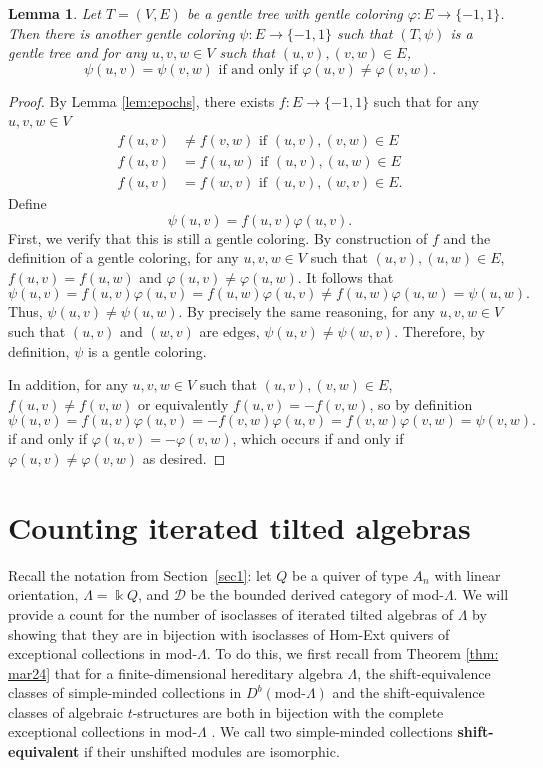 \documentclass[12pt]{amsart}
\newtheorem{lem}[thm]{Lemma}
\theoremstyle{definition}
\theoremstyle{remark}
\numberwithin{equation}{section}
\newcommand{\kk}{\ensuremath{\Bbbk}}
\newcommand{\cD}{\ensuremath{{\mathcal{D}}}}
\begin{document}
\begin{lem}\label{lem: canonical ideal}
Let $T = (V,E)$ be a gentle tree with gentle coloring $\varphi: E \to \{-1,1\}$. Then there is another gentle coloring $\psi: E \to \{-1,1\}$ such that $(T, \psi)$ is a gentle tree and for any $u, v, w \in V$ such that $(u,v), (v,w) \in E$, 
\[\psi(u,v) = \psi(v,w) \text{ if and only if } \varphi(u,v) \neq \varphi(v,w).\]
\end{lem}

\begin{proof}
By Lemma \ref{lem:epochs}, there exists $f: E \to \{-1,1\}$ such that for any $u, v, w \in V$
\begin{align*}
    f(u,v) &\neq f(v,w) \text{ if } (u,v), (v,w) \in E \\
    f(u,v) &= f(u,w) \text{ if } (u,v), (u,w) \in E \\
    f(u,v) &= f(w,v) \text{ if } (u,v), (w,v) \in E.
    \end{align*}
Define 
\[\psi(u,v) = f(u,v)\varphi(u,v).\]
First, we verify that this is still a gentle coloring. By construction of $f$ and the definition of a gentle coloring, for any $u, v, w \in V$ such that $(u,v), (u,w) \in E$, $f(u,v) = f(u,w)$ and $\varphi(u,v) \neq \varphi(u,w)$. It follows that
\[\psi(u,v) = f(u,v) \varphi(u,v) = f(u,w)\varphi(u,v) \neq f(u,w) \varphi(u,w) = \psi(u,w). \]
Thus, $\psi(u,v) \neq \psi(u,w)$. By precisely the same reasoning, for any $u,v,w \in V$ such that $(u,v)$ and $(w,v)$ are edges, $\psi(u,v) \neq \psi(w,v)$. Therefore, by definition, $\psi$ is a gentle coloring.

In addition, for any $u,v,w \in V$ such that $(u,v), (v,w) \in E$, $f(u,v) \neq f(v,w)$ or equivalently $f(u,v) = -f(v,w)$, so by definition
\[\psi(u,v) = f(u,v)\varphi(u,v) = -f(v,w) \varphi(u,v) = f(v,w) \varphi(v,w) = \psi(v,w).\]
if and only if $\varphi(u,v) = -\varphi(v,w)$, which occurs if and only if $\varphi(u,v) \neq \varphi(v,w)$ as desired.
\end{proof}

\section{Counting iterated tilted algebras}\label{sec2}

Recall the notation from Section~\ref{sec1}: let $Q$ be a quiver of type $A_n$ with linear orientation, $\Lambda = \kk Q$, and $\cD$ be the bounded derived category of mod-$\Lambda$. We will provide a count for the number of isoclasses of iterated tilted algebras of $\Lambda$ by showing that they are in bijection with isoclasses of Hom-Ext quivers of exceptional collections in mod-$\Lambda$. To do this, we first recall from Theorem \ref{thm: mar24} that for a finite-dimensional hereditary algebra $\Lambda$, the shift-equivalence classes of simple-minded collections in $D^b(\text{mod-}\Lambda)$ and the shift-equivalence classes of algebraic $t$-structures are both in bijection with the complete exceptional collections in mod-$\Lambda$ \cite[Theorem 4.4]{maresca2024exceptional}. We call two simple-minded collections \textbf{shift-equivalent} if their unshifted modules are isomorphic.
\end{document}
